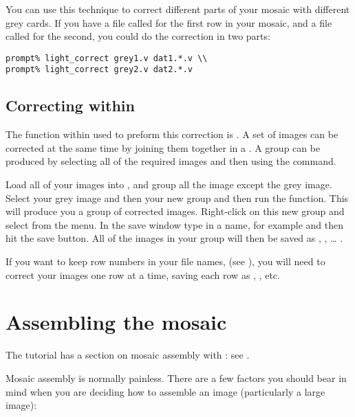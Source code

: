 You can use this technique to correct different parts of your mosaic
with different grey cards. If you have a file called  for the
first row in your mosaic, and a file called  for the second, you
could do the correction in two parts:

\begin{verbatim}
prompt% light_correct grey1.v dat1.*.v \\
prompt% light_correct grey2.v dat2.*.v
\end{verbatim}

\subsection{Correcting within \nip{}}

The function within \nip{} used to preform this correction is
.  A set of images can be corrected
at the same time by joining them together in a .  A group can
be produced by selecting all of the required images and then using the
 command.

Load all of your images into \nip{}, and group all the image except the
grey image.  Select your grey image and then your new group and then run
the  function.  This will produce
you a group of corrected images.  Right-click on this new group and select
 from the menu.  In the save window type in a name, for example
 and then hit the save button.  All of the images in your group
will then be saved as , , 
\ldots{} .

If you want to keep row numbers in your file names, (see ),
you will need to correct your images one row at a time, saving each row as
, , etc.

\section{Assembling the mosaic}

The tutorial has a section on mosaic assembly with \nip{}: see .

Mosaic assembly is normally painless.  There are a few factors
you should bear in mind when you are deciding how to assemble an image
(particularly a large image):


